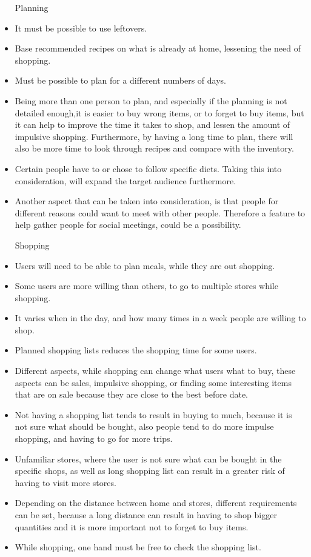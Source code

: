 \begin{itemize}
  \item[Planning]
    \item It must be possible to use leftovers.
    \item Base recommended recipes on what is already at home, lessening the need of shopping.
    \item Must be possible to plan for a different numbers of days.
    \item Being more than one person to plan, and especially if the planning is not detailed enough,it is easier to buy wrong items, or to forget to buy items, but it can help to improve the time it takes to shop, and lessen the amount of impulsive shopping. Furthermore, by having a long time to plan, there will also be more time to look through recipes and compare with the inventory.
    \item Certain people have to or chose to follow specific diets. Taking this into consideration, will expand the target audience furthermore.
    \item Another aspect that can be taken into consideration, is that people for different reasons could want to meet with other people. Therefore a feature to help gather people for social meetings, could be a possibility.
  
  \item[Shopping]
    \item Users will need to be able to plan meals, while they are out shopping.  
    \item Some users are more willing than others, to go to multiple stores while shopping.
    \item It varies when in the day, and how many times in a week people are willing to shop.
    \item Planned shopping lists reduces the shopping time for some users.
    \item Different aspects, while shopping can change what users what to buy, these aspects can be sales, impulsive shopping, or finding some interesting items that are on sale because they are close to the best before date.
    \item Not having a shopping list tends to result in buying to much, because it is not sure what should be bought, also people tend to do more impulse shopping, and having to go for more trips.
    \item Unfamiliar stores, where the user is not sure what can be bought in the specific shops, as well as long shopping list can result in a greater risk of having to visit more stores.
    \item Depending on the distance between home and stores, different requirements can be set, because a long distance can result in having to shop bigger quantities and it is more important not to forget to buy items.
    \item While shopping, one hand must be free to check the shopping list.
    

\end{itemize}
